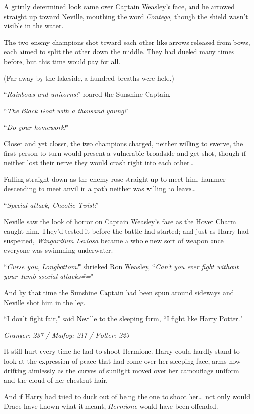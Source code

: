 A grimly determined look came over Captain Weasley's face, and he arrowed straight up toward Neville, mouthing the word \emph{Contego,} though the shield wasn't visible in the water.

The two enemy champions shot toward each other like arrows released from bows, each aimed to split the other down the middle. They had dueled many times before, but this time would pay for all.

(Far away by the lakeside, a hundred breaths were held.)

``\emph{Rainbows and unicorns!}" roared the Sunshine Captain.

``\emph{The Black Goat with a thousand young!}"

``\emph{Do your homework!}"

Closer and yet closer, the two champions charged, neither willing to swerve, the first person to turn would present a vulnerable broadside and get shot, though if neither lost their nerve they would crash right into each other{\ldots}

Falling straight down as the enemy rose straight up to meet him, hammer descending to meet anvil in a path neither was willing to leave{\ldots}

``\emph{Special attack, Chaotic Twist!}"

Neville saw the look of horror on Captain Weasley's face as the Hover Charm caught him. They'd tested it before the battle had started; and just as Harry had suspected, \emph{Wingardium Leviosa} became a whole new sort of weapon once everyone was swimming underwater.

``\emph{Curse you, Longbottom!}" shrieked Ron Weasley, ``\emph{Can't you ever fight without your dumb special attacks\===}"

And by that time the Sunshine Captain had been spun around sideways and Neville shot him in the leg.

``I don't fight fair," said Neville to the sleeping form, ``I fight like Harry Potter."

\later

\emph{Granger: 237 / Malfoy: 217 / Potter: 220}

It still hurt every time he had to shoot Hermione. Harry could hardly stand to look at the expression of peace that had come over her sleeping face, arms now drifting aimlessly as the curves of sunlight moved over her camouflage uniform and the cloud of her chestnut hair.

And if Harry had tried to duck out of being the one to shoot her{\ldots} not only would Draco have known what it meant, \emph{Hermione} would have been offended.

